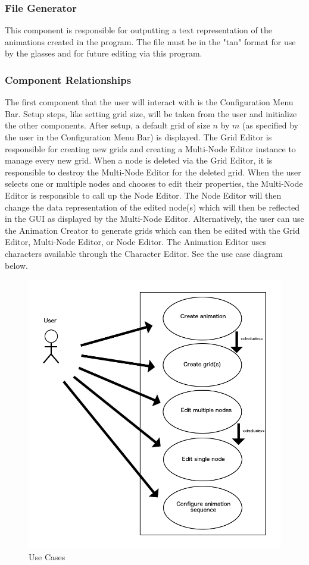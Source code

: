\documentclass[12pt]{article}
\begin{document}
	\subsubsection{File Generator}
  	This component is responsible for outputting a text representation of the animations created in the program. The file must be in the "tan" format for use by the glasses and for future editing via this program.
	
	\subsubsection{Component Relationships}
  	The first component that the user will interact with is the Configuration Menu Bar. Setup steps, like setting grid size, will be taken from the user and initialize the other components.	
  	After setup, a default grid of size $n$ by $m$ (as specified by the user in the Configuration Menu Bar) is displayed. The Grid Editor is responsible for creating new grids and creating a Multi-Node Editor instance to manage every new grid. When a node is deleted via the Grid Editor, it is responsible to destroy the Multi-Node Editor for the deleted grid.  	
  	When the user selects one or multiple nodes and chooses to edit their properties, the Multi-Node Editor is responsible to call up the Node Editor. The Node Editor will then change the data representation of the edited node(s) which will then be reflected in the GUI as displayed by the Multi-Node Editor.  	
  	Alternatively, the user can use the Animation Creator to generate grids which can then be edited with the Grid Editor, Multi-Node Editor, or Node Editor. The Animation Editor uses characters available through the Character Editor.  	
  	See the use case diagram below.	
    
  	\begin{figure}[ht!]
  		\centering
  		\includegraphics[width=0.9\linewidth]{Relationship_Use.png}
  		\caption{Use Cases}
  	\end{figure}
	\clearpage	
\newpage
\end{document}
